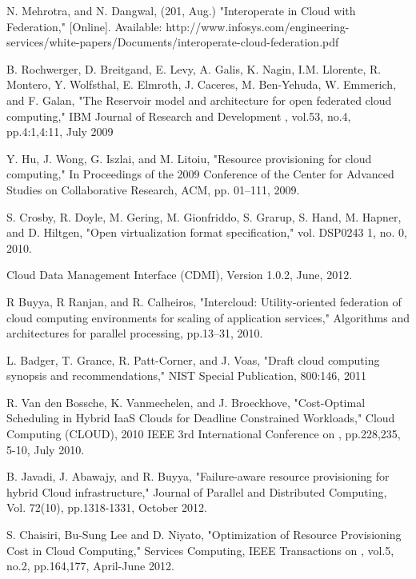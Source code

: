 \documentclass[conference]{IEEEtran}
\begin{document}
\begin{thebibliography}{4}
 N. Mehrotra, and  N. Dangwal, (201, Aug.) "Interoperate in Cloud with Federation," [Online]. Available: http://www.infosys.com/engineering-services/white-papers/Documents/interoperate-cloud-federation.pdf

B. Rochwerger, D. Breitgand, E. Levy, A. Galis, K. Nagin, I.M. Llorente, R. Montero, Y. Wolfsthal, E. Elmroth, J. Caceres, M. Ben-Yehuda, W. Emmerich, and F. Galan, "The Reservoir model and architecture for open federated cloud computing," IBM Journal of Research and Development , vol.53, no.4, pp.4:1,4:11, July 2009

 Y. Hu, J. Wong, G. Iszlai, and M. Litoiu, "Resource provisioning for cloud computing," In Proceedings of the 2009 Conference of the Center for Advanced Studies on Collaborative Research, ACM, pp. 01--111, 2009.

S. Crosby, R. Doyle, M. Gering, M. Gionfriddo, S. Grarup, S. Hand, M. Hapner, and D. Hiltgen, "Open virtualization format specification," vol. DSP0243 1, no. 0, 2010.

 Cloud Data Management Interface (CDMI), Version 1.0.2, June, 2012.

 R Buyya, R Ranjan, and R. Calheiros, "Intercloud: Utility-oriented federation of cloud computing environments for scaling of application services," Algorithms and architectures for parallel processing, pp.13--31, 2010.

 L. Badger, T. Grance, R. Patt-Corner, and J. Voas, "Draft cloud computing synopsis and recommendations," NIST Special Publication, 800:146, 2011

 R. Van den Bossche, K. Vanmechelen, and J. Broeckhove, "Cost-Optimal Scheduling in Hybrid IaaS Clouds for Deadline Constrained Workloads," Cloud Computing (CLOUD), 2010 IEEE 3rd International Conference on ,  pp.228,235, 5-10, July 2010.

 B. Javadi, J. Abawajy, and R. Buyya, "Failure-aware resource provisioning for hybrid Cloud infrastructure," Journal of Parallel and Distributed  Computing, Vol. 72(10), pp.1318-1331, October 2012.

S. Chaisiri, Bu-Sung Lee and D. Niyato, "Optimization of Resource Provisioning Cost in Cloud Computing," Services Computing, IEEE Transactions on , vol.5, no.2, pp.164,177, April-June 2012.



\end{thebibliography}
\end{document}
